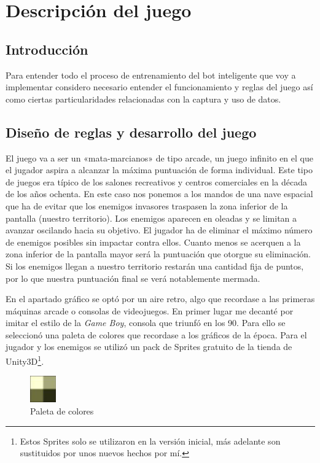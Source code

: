 

\section{Descripción del juego}

\subsection{Introducción}
Para entender todo el proceso de entrenamiento del bot inteligente que voy a implementar considero necesario entender el funcionamiento y reglas del juego así como ciertas particularidades relacionadas con la captura y uso de datos.
\subsection{Diseño de reglas y desarrollo del juego}

El juego va a ser un «mata-marcianos» de tipo arcade, un juego infinito en el que el jugador aspira a alcanzar la máxima puntuación de forma individual. Este tipo de juegos era típico de los salones recreativos y centros comerciales en la década de los años ochenta. En este caso nos ponemos a los mandos de una nave espacial que ha de evitar que los enemigos invasores traspasen la zona inferior de la pantalla (nuestro territorio). Los enemigos aparecen en oleadas y se limitan a avanzar oscilando hacia su objetivo. El jugador ha de eliminar el máximo número de enemigos posibles sin impactar contra ellos. Cuanto menos se acerquen a la zona inferior de la pantalla mayor será la puntuación que otorgue su eliminación. Si los enemigos llegan a nuestro territorio restarán una cantidad fija de puntos, por lo que nuestra puntuación final se verá notablemente mermada.



En el apartado gráfico se optó por un aire retro, algo que recordase a las primeras máquinas arcade o consolas de videojuegos. En primer lugar me decanté por imitar el estilo de la \emph{Game Boy}, consola que triunfó en los 90. Para ello se seleccionó una paleta de colores que recordase a los gráficos de la época. Para el jugador y los enemigos se utilizó un pack de Sprites gratuito de la tienda de Unity3D\footnote{Estos Sprites solo se utilizaron en la versión inicial, más adelante son sustituidos por unos nuevos hechos por mí.}.

\begin{figure}[]
\centering
\includegraphics[width=0.1\textwidth]{./img/paleta_de_colores}
\caption{Paleta de colores}
\end{figure}


